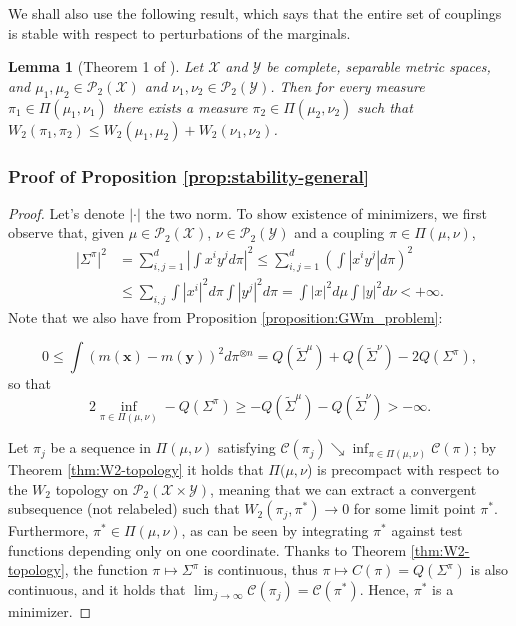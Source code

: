 \documentclass{article}
\newcommand{\Y}{\mathcal{Y}}
\newcommand{\X}{\mathcal{X}}
\newcommand{\1}{\mathbf{1}}
\renewcommand{\P}{\mathcal{P}}
\newtheorem{lemma}{Lemma}
\theoremstyle{definition}
\theoremstyle{remark}
\begin{document}
\begin{appendices}
We shall also use the following result, which says that the entire set of couplings is stable with respect to perturbations of the marginals.

\begin{lemma}[Theorem 1 of \cite{bogachev2024hausdorff}]
\label{lem:glueing-convergence}
Let $\mathcal{X}$ and $\mathcal{Y}$ be complete, separable metric
spaces, and $\mu_{1},\mu_{2}\in\mathcal{P}_{2}(\mathcal{X})$ and
$\nu_{1},\nu_{2}\in\mathcal{P}_{2}(\mathcal{Y})$. Then for every
measure $\pi_{1}\in\Pi(\mu_{1},\nu_{1})$ there exists a measure $\pi_{2}\in\Pi(\mu_{2},\nu_{2})$
such that $W_{2}(\pi_{1},\pi_{2})\leq W_{2}(\mu_{1},\mu_{2})+W_{2}(\nu_{1},\nu_{2})$.
\end{lemma}

\subsubsection*{Proof of Proposition \ref{prop:stability-general}}
\begin{proof}
Let's denote $|\cdot|$ the two norm. To show existence of minimizers, we first observe that, given $\mu\in\P_2(\X)$, $\nu\in\P_2(\Y)$ and a coupling $\pi\in\Pi(\mu,\nu)$,
\begin{align*}
    |\Sigma^{\pi}|^2& =\sum_{i,j=1}^d\left|\int x^iy^jd\pi\right|^2\leq \sum_{i,j=1}^d\left(\int |x^iy^j|d\pi \right)^2 \\&\leq\sum_{i,j}\int |x^i|^2d\pi \int|y^j|^2d\pi = \int |x|^2d\mu \int |y|^2d\nu<+\infty.
\end{align*}
Note that we also have from Proposition \ref{proposition:GWm_problem}:

\[0\leq\int (m(\mathbf{x})-m(\mathbf{y}))^2 d\pi^{\otimes n}= Q(\tilde{\Sigma}^\mu)+Q(\tilde{\Sigma}^\nu)-2Q(\Sigma^\pi),\]
so that \[2\inf_{\pi\in\Pi(\mu,\nu)}-Q(\Sigma^\pi)\geq -Q(\tilde{\Sigma}^\mu)-Q(\tilde{\Sigma}^\nu)>-\infty.\]

Let $\pi_{j}$ be a sequence
in $\Pi(\mu,\nu)$ satisfying $\mathcal{C}(\pi_{j})\searrow\inf_{\pi\in\Pi(\mu,\nu)}\mathcal{C}(\pi)$;
by Theorem \ref{thm:W2-topology}  it holds that
$\Pi(\mu,\nu$) is precompact with respect to the $W_{2}$ topology
on $\mathcal{P}_{2}(\mathcal{X}\times\mathcal{Y})$, meaning that
we can extract a convergent subsequence (not relabeled) such that
$W_{2}(\pi_{j},\pi^{*})\rightarrow0$ for some limit point $\pi^{*}$.
Furthermore, $\pi^{*}\in\Pi(\mu,\nu)$, as can be seen by integrating
$\pi^{*}$ against test functions depending only on one coordinate.
Thanks to Theorem \ref{thm:W2-topology}, the function $\pi\mapsto\Sigma^\pi$ is continuous, thus $\pi\mapsto C(\pi)=Q(\Sigma^\pi)$ is also continuous, and it holds that $\lim_{j\rightarrow\infty}\mathcal{C}(\pi_{j})=\mathcal{C}(\pi^{*})$.
Hence, $\pi^{*}$ is a minimizer. 


\end{proof}
\end{appendices}
\end{document}
